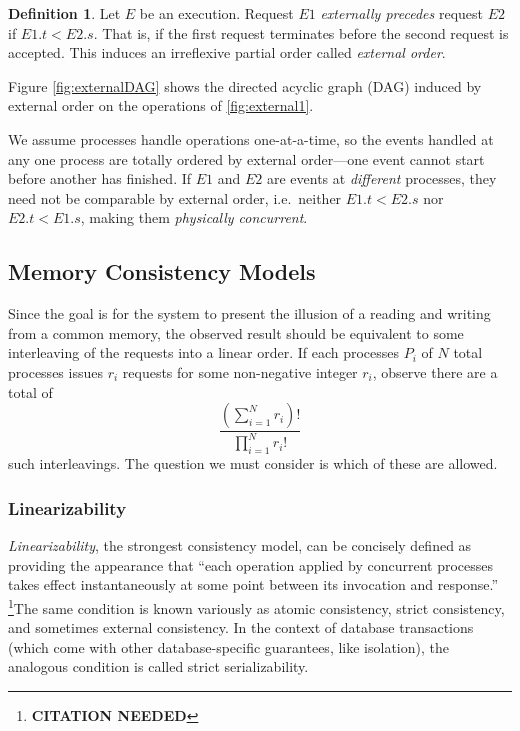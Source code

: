 \documentclass[]             %
{NASA}                       %
\theoremstyle{definition}
\newtheorem{definition}{Definition}[section]
\newcommand{\citationneeded}{\footnote{\textbf{CITATION NEEDED}}}
\begin{document}
\begin{definition}
  Let $E$ be an execution. Request $E1$ \emph{externally precedes}
  request $E2$ if $E1.t < E2.s$. That is, if the first request
  terminates before the second request is accepted. This induces an
  irreflexive partial order called \emph{external order}.
\end{definition}

Figure \ref{fig:externalDAG} shows the directed acyclic graph (DAG)
induced by external order on the operations of \ref{fig:external1}.

We assume processes handle operations one-at-a-time, so the events
handled at any one process are totally ordered by external order---one
event cannot start before another has finished. If \(E1\) and \(E2\)
are events at \emph{different} processes, they need not be comparable
by external order, i.e.~neither \(E1.t < E2.s\) nor \(E2.t < E1.s\),
making them \emph{physically concurrent}.

\subsection{Memory Consistency Models}

Since the goal is for the system to present the illusion of a reading
and writing from a common memory, the observed result should be
equivalent to some interleaving of the requests into a linear
order. If each processes $P_i$ of $N$ total processes issues $r_i$
requests for some non-negative integer $r_i$, observe there are a
total of
\[
\frac{\left(\sum_{i = 1}^N r_i\right)!}{\prod_{i = 1}^N r_i!}
\]
such interleavings. The question we must consider is which of these
are allowed.

\subsubsection{Linearizability}
\label{sssec:linearizability}

\emph{Linearizability}, the strongest consistency model, can be
concisely defined as providing the appearance that ``each operation
applied by concurrent processes takes effect instantaneously at some
point between its invocation and response.'' \citationneeded The same
condition is known variously as atomic consistency, strict
consistency, and sometimes external consistency. In the context of
database transactions (which come with other database-specific
guarantees, like isolation), the analogous condition is called strict
serializability.
\end{document}
